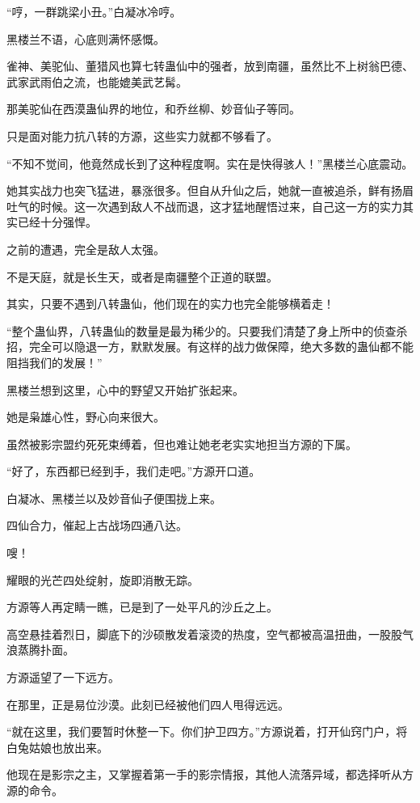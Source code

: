 
\begin{this_body}

“哼，一群跳梁小丑。”白凝冰冷哼。

黑楼兰不语，心底则满怀感慨。

雀神、美驼仙、董猎风也算七转蛊仙中的强者，放到南疆，虽然比不上树翁巴德、武家武雨伯之流，也能媲美武艺髯。

那美驼仙在西漠蛊仙界的地位，和乔丝柳、妙音仙子等同。

只是面对能力抗八转的方源，这些实力就都不够看了。

“不知不觉间，他竟然成长到了这种程度啊。实在是快得骇人！”黑楼兰心底震动。

她其实战力也突飞猛进，暴涨很多。但自从升仙之后，她就一直被追杀，鲜有扬眉吐气的时候。这一次遇到敌人不战而退，这才猛地醒悟过来，自己这一方的实力其实已经十分强悍。

之前的遭遇，完全是敌人太强。

不是天庭，就是长生天，或者是南疆整个正道的联盟。

其实，只要不遇到八转蛊仙，他们现在的实力也完全能够横着走！

“整个蛊仙界，八转蛊仙的数量是最为稀少的。只要我们清楚了身上所中的侦查杀招，完全可以隐退一方，默默发展。有这样的战力做保障，绝大多数的蛊仙都不能阻挡我们的发展！”

黑楼兰想到这里，心中的野望又开始扩张起来。

她是枭雄心性，野心向来很大。

虽然被影宗盟约死死束缚着，但也难让她老老实实地担当方源的下属。

“好了，东西都已经到手，我们走吧。”方源开口道。

白凝冰、黑楼兰以及妙音仙子便围拢上来。

四仙合力，催起上古战场四通八达。

嗖！

耀眼的光芒四处绽射，旋即消散无踪。

方源等人再定睛一瞧，已是到了一处平凡的沙丘之上。

高空悬挂着烈日，脚底下的沙硕散发着滚烫的热度，空气都被高温扭曲，一股股气浪蒸腾扑面。

方源遥望了一下远方。

在那里，正是易位沙漠。此刻已经被他们四人甩得远远。

“就在这里，我们要暂时休整一下。你们护卫四方。”方源说着，打开仙窍门户，将白兔姑娘也放出来。

他现在是影宗之主，又掌握着第一手的影宗情报，其他人流落异域，都选择听从方源的命令。


\end{this_body}
